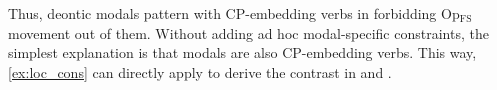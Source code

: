 \documentclass[11pt]{article}
\let\latextextsubscript\textsubscript
\let\textsubscript\latextextsubscript
\newcommand{\gap}[1]{\rule{1em}{0.4pt}\textsubscript{#1}}
\newcommand{\F}{\ensuremath{_{\mathrm{F}}}}
\newcommand{\opfs}{Op\(_{\mathrm{FS}}\)}
\begin{document}
%

Thus, deontic modals pattern with CP-embedding verbs in forbidding \opfs{} movement out of them.
Without adding ad hoc modal-specific constraints, the simplest explanation is that modals are also CP-embedding verbs.
This way, \cref{ex:loc_cons} can directly apply to derive the contrast in \LLast and \Last.

%
\end{document}
